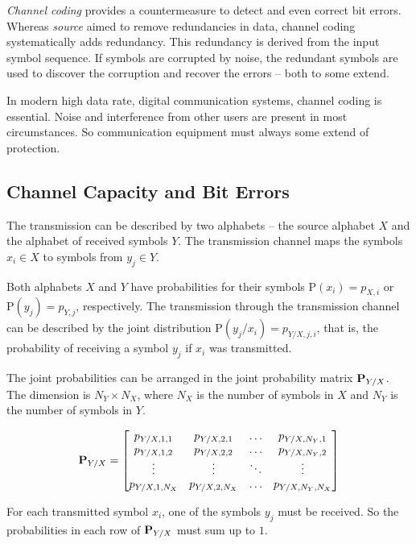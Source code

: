 \begin{refsection}
 \emph{Channel coding} provides a countermeasure to detect and even correct bit errors. Whereas \emph{source} aimed to remove redundancies in data, channel coding systematically adds redundancy. This redundancy is derived from the input symbol sequence. If symbols are corrupted by noise, the redundant symbols are used to discover the corruption and recover the errors -- both to some extend.

In modern high data rate, digital communication systems, channel coding is essential. Noise and interference from other users are present in most circumstances. So communication equipment must always some extend of protection.

\subsection{Channel Capacity and Bit Errors}

The transmission can be described by two alphabets -- the source alphabet $X$ and the alphabet of received symbols $Y$. The transmission channel maps the symbols $x_i \in X$ to symbols from $y_j \in Y$.


Both alphabets $X$ and $Y$ have probabilities for their symbols $\mathrm{P}(x_i) = p_{X,i}$ or $\mathrm{P}(y_j) = p_{Y,j}$, respectively. The transmission through the transmission channel can be described by the joint distribution $\mathrm{P}(y_j/x_i) = p_{Y/X,j,i}$, that is, the probability of receiving a symbol $y_j$ if $x_i$ was transmitted.

The joint probabilities can be arranged in the joint probability matrix $\bm{\mathrm{P}}_{Y/X}$. The dimension is $N_Y \times N_X$, where $N_X$ is the number of symbols in $X$ and $N_Y$ is the number of symbols in $Y$.

\begin{equation}
	\bm{\mathrm{P}}_{Y/X} = \left[\begin{matrix}
		p_{Y/X,1,1} & p_{Y/X,2,1} & \ldots & p_{Y/X,N_Y,1} \\
		p_{Y/X,1,2} & p_{Y/X,2,2} & \ldots & p_{Y/X,N_Y,2} \\
		\vdots & \vdots & \ddots & \vdots \\
		p_{Y/X,1,N_X} & p_{Y/X,2,N_X} & \ldots & p_{Y/X,N_Y,N_X} \\
	\end{matrix}\right]
\end{equation}

For each transmitted symbol $x_i$, one of the symbols $y_j$ must be received. So the probabilities in each row of $\bm{\mathrm{P}}_{Y/X}$ must sum up to $1$.


\end{refsection}
